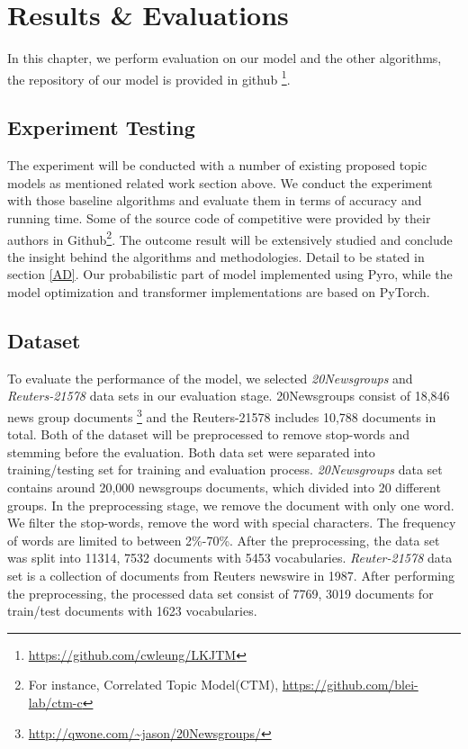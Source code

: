 \section{Results \& Evaluations}
In this chapter, we perform evaluation on our model and the other algorithms, the repository of our model is provided in github \footnote{\url{https://github.com/cwleung/LKJTM}}.
\subsection{Experiment Testing}
The experiment will be conducted with a number of existing proposed topic models as mentioned related work section above. We conduct the experiment with those baseline algorithms and evaluate them in terms of accuracy and running time. Some of the source code of competitive were provided by their authors in Github\footnote{For instance, Correlated Topic Model(CTM), \href{https://github.com/blei-lab/ctm-c}{https://github.com/blei-lab/ctm-c}}. The outcome result will be extensively studied and conclude the insight behind the algorithms and methodologies. Detail to be stated in section \ref{AD}. Our probabilistic part of model implemented using Pyro\cite{bingham_pyro_2019}, while the model optimization and transformer implementations are based on PyTorch\cite{paszke_automatic_2017}.
\subsection{Dataset}To evaluate the performance of the model, we selected \textit{20Newsgroups} and \textit{Reuters-21578} data sets in our evaluation stage. 20Newsgroups consist of 18,846 news group documents \footnote{\url{http://qwone.com/~jason/20Newsgroups/}} and the Reuters-21578 includes 10,788 documents in total. Both of the dataset will be preprocessed to remove stop-words and stemming before the evaluation. Both data set were separated into training/testing set for training and evaluation process. 
\textit{20Newsgroups} data set contains around 20,000 newsgroups documents, which divided into 20 different groups. In the preprocessing stage, we remove the document with only one word. We filter the stop-words, remove the word with special characters. The frequency of words are limited to between 2\%-70\%. After the preprocessing, the data set was split into 11314, 7532 documents with 5453 vocabularies. 
\textit{Reuter-21578} data set is a collection of documents from Reuters newswire in 1987. After performing the preprocessing, the processed data set consist of 7769, 3019 documents for train/test documents with 1623 vocabularies.
